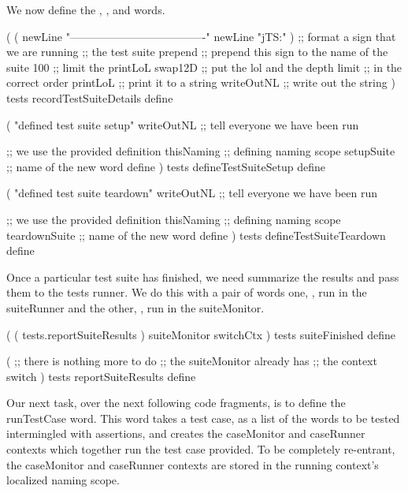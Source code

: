 We now define the , 
, and  words. 

\startJoylolCode
(
  (
    newLine
    "-------------------------------------"
    newLine
    "jTS:"
  )           ;; format a sign that we are running
              ;; the test suite
  prepend     ;; prepend this sign to the name of the suite
  100         ;; limit the printLoL
  swap12D     ;; put the lol and the depth limit 
              ;; in the correct order
  printLoL    ;; print it to a string
  writeOutNL  ;; write out the string
)
tests
recordTestSuiteDetails
define
\stopJoylolCode

\startJoylolCode
(
  "defined test suite setup"
  writeOutNL  ;; tell everyone we have been run

              ;; we use the provided definition
  thisNaming  ;; defining naming scope
  setupSuite  ;; name of the new word
  define
)
tests
defineTestSuiteSetup
define
\stopJoylolCode

\startJoylolCode
(
  "defined test suite teardown"
  writeOutNL    ;; tell everyone we have been run

                ;; we use the provided definition
  thisNaming    ;; defining naming scope
  teardownSuite ;; name of the new word
  define
)
tests
defineTestSuiteTeardown
define
\stopJoylolCode

Once a particular test suite has finished, we need summarize the results 
and pass them to the tests runner. We do this with a pair of words one, 
, run in the suiteRunner and the other, 
, run in the suiteMonitor. 

\startJoylolCode
(
  ( tests.reportSuiteResults )
  suiteMonitor
  switchCtx
)
tests
suiteFinished
define
\stopJoylolCode

\startJoylolCode
(
          ;; there is nothing more to do
          ;; the suiteMonitor already has
          ;; the context switch 
)
tests
reportSuiteResults
define
\stopJoylolCode

\stopTestSuite

\startTestSuite[runTestCase]

Our next task, over the next following code fragments, is to define the 
runTestCase word. This word takes a test case, as a list of the words to 
be tested intermingled with assertions, and creates the caseMonitor and 
caseRunner contexts which together run the test case provided. To be 
completely re-entrant, the caseMonitor and caseRunner contexts are stored 
in the running context's localized naming scope. 

